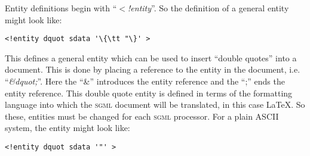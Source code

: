 Entity definitions begin with ``\textit{$<$!entity}''. So the definition of a general
entity might look like:
\begin{verbatim}
<!entity dquot sdata '\{\tt "\}' >
\end{verbatim}
\noindent
This defines a general entity which can be used to insert ``double
quotes'' into a document. This is done by placing a reference to the
entity in the document, i.e. ``\textit{\&dquot;}''. Here the ``\&'' introduces
the entity reference and the ``;'' ends the entity reference. This double
quote entity is defined in terms of the formatting language into which the 
\textsc{sgml} document will be translated, in this case \LaTeX. So these, 
entities must be changed for each \textsc{sgml} processor. For a plain ASCII 
system, the entity might look like:
\begin{verbatim}
<!entity dquot sdata '"' >
\end{verbatim}

